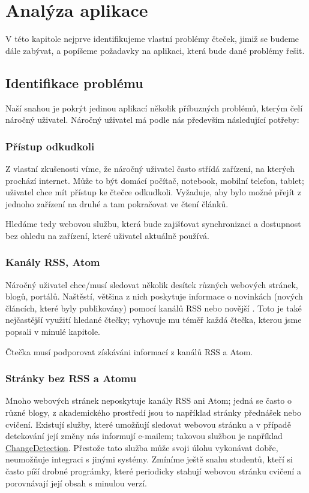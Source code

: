 \chapter{Analýza aplikace}

V této kapitole nejprve identifikujeme vlastní problémy čteček, jimiž se budeme dále zabývat, a popíšeme požadavky na aplikaci, která bude dané problémy řešit.

\section{Identifikace problému}

Naší snahou je pokrýt jedinou aplikací několik příbuzných problémů, kterým čelí náročný uživatel.
Náročný uživatel má podle nás především následující potřeby:

\subsection{Přístup odkudkoli}
Z vlastní zkušenosti víme, že náročný uživatel často střídá zařízení, na kterých prochází internet.
Může to být domácí počítač, notebook, mobilní telefon, tablet; uživatel chce mít přístup ke čtečce odkudkoli.
Vyžaduje, aby bylo možné přejít z jednoho zařízení na druhé a tam pokračovat ve čtení článků.

Hledáme tedy webovou službu, která bude zajišťovat synchronizaci a dostupnost bez ohledu na zařízení, které uživatel aktuálně používá.

\subsection{Kanály RSS, Atom}
Náročný uživatel chce/musí sledovat několik desítek různých webových stránek, blogů, portálů.
Naštěstí, většina z nich poskytuje informace o novinkách (nových článcích, které byly publikovány) pomocí kanálů RSS nebo novější .
Toto je také nejčastější využití hledané čtečky; vyhovuje mu téměř každá čtečka, kterou jsme popsali v minulé kapitole.

Čtečka musí podporovat získáváni informací z kanálů RSS a Atom.

\subsection{Stránky bez RSS a Atomu}
Mnoho webových stránek neposkytuje kanály RSS ani Atom; jedná se často o různé blogy, z akademického prostředí jsou to například stránky přednášek nebo cvičení.
Existují služby, které umožňují sledovat webovou stránku a v případě detekování její změny nás informují e-mailem; takovou službou je například \href{http://www.changedetection.com/}{ChangeDetection}.
Přestože tato služba může svoji úlohu vykonávat dobře, neumožňuje integraci s jinými systémy.
Zmíníme ještě snahu studentů, kteří si často píší drobné prográmky, které periodicky stahují webovou stránku cvičení a porovnávají její obsah s minulou verzí.

